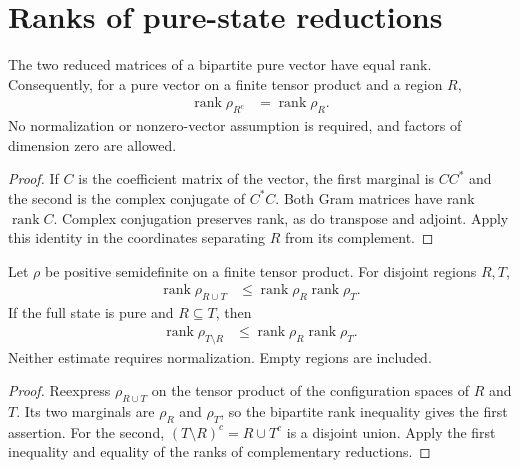 \section{Ranks of pure-state reductions}
\label{sec:regional_rank}

\begin{theorem}
  \label{thm:complementary_reduced_ranks}
  \leanok
  The two reduced matrices of a bipartite pure vector have equal rank.
  Consequently, for a pure vector on a finite tensor product and a region $R$,
  \begin{align}
    \label{eq:complementary_reduced_ranks}
    \operatorname{rank}\rho_{R^c}&=\operatorname{rank}\rho_R.
  \end{align}
  No normalization or nonzero-vector assumption is required, and factors of
  dimension zero are allowed.
\end{theorem}
\begin{proof}\leanok
  If $C$ is the coefficient matrix of the vector, the first marginal is
  $CC^\ast$ and the second is the complex conjugate of $C^\ast C$.
  Both Gram matrices have rank $\operatorname{rank}C$. Complex conjugation
  preserves rank, as do transpose and adjoint. Apply this identity in the
  coordinates separating $R$ from its complement.
\end{proof}

\begin{theorem}
  \label{thm:regional_union_rank}
  \leanok
  Let $\rho$ be positive semidefinite on a finite tensor product. For
  disjoint regions $R,T$,
  \begin{align}
    \label{eq:regional_union_rank}
    \operatorname{rank}\rho_{R\cup T}
      &\le\operatorname{rank}\rho_R\operatorname{rank}\rho_T.
  \end{align}
  If the full state is pure and $R\subseteq T$, then
  \begin{align}
    \label{eq:regional_nested_difference_rank}
    \operatorname{rank}\rho_{T\setminus R}
      &\le\operatorname{rank}\rho_R\operatorname{rank}\rho_T.
  \end{align}
  Neither estimate requires normalization. Empty regions are included.
\end{theorem}
\begin{proof}\leanok
  Reexpress $\rho_{R\cup T}$ on the tensor product of the configuration
  spaces of $R$ and $T$. Its two marginals are $\rho_R$ and $\rho_T$, so the
  bipartite rank inequality gives the first assertion. For the second,
  $(T\setminus R)^c=R\cup T^c$ is a disjoint union. Apply the first inequality
  and equality of the ranks of complementary reductions.
\end{proof}
